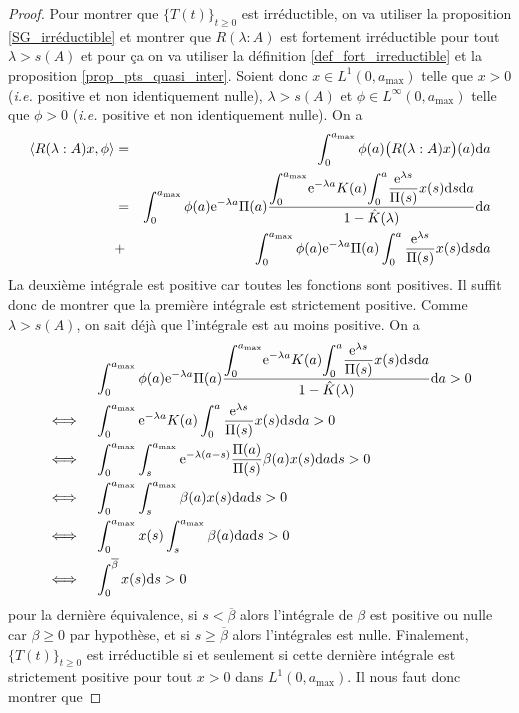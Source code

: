 \begin{proof}
    Pour montrer que $\big\{T(t)\big\}_{t \geq 0}$ est irréductible, on va utiliser la proposition \ref{SG_irréductible} et montrer que $R(\lambda : A)$ est fortement irréductible pour tout $\lambda > s(A)$ et pour ça on va utiliser la définition \ref{def_fort_irreductible} et la proposition \ref{prop_pts_quasi_inter}. Soient donc $x \in L^1(0,a_{\max})$ telle que $x > 0$ (\textit{i.e.} positive et non identiquement nulle), $\lambda > s(A)$ et $\phi \in L^{\infty}(0,a_{\max})$ telle que $\phi > 0$ (\textit{i.e.} positive et non identiquement nulle). On a 
    \begin{eqnarray*}
        \langle R(\lambda : A)x,\phi \rangle &=& \int_0^{a_{\max}} \phi(a)\big(R(\lambda : A)x\big)(a)\mathrm{d} a \\
        &=& \int_0^{a_{\max}} \phi(a)\mathrm{e}^{-\lambda a}\Pi(a)\frac{\displaystyle{\int_0^{a_{\max}}}\mathrm{e}^{-\lambda a}K(a)\displaystyle{\int_0^a} \dfrac{\mathrm{e}^{\lambda s}}{\Pi(s)}x(s)\mathrm{d} s\mathrm{d} a}{1-\hat{K}(\lambda)}\mathrm{d} a \\
        &+& \int_0^{a_{\max}} \phi(a)\mathrm{e}^{-\lambda a}\Pi(a)\int_0^a \frac{\mathrm{e}^{\lambda s}}{\Pi(s)}x(s)\mathrm{d} s\mathrm{d} a
    \end{eqnarray*}
    La deuxième intégrale est positive car toutes les fonctions sont positives. Il suffit donc de montrer que la première intégrale est strictement positive. Comme $\lambda > s(A)$, on sait déjà que l'intégrale est au moins positive. On a 
    \begin{align*}
        &\int_0^{a_{\max}} \phi(a)\mathrm{e}^{-\lambda a}\Pi(a)\frac{\displaystyle{\int_0^{a_{\max}}}\mathrm{e}^{-\lambda a}K(a)\displaystyle{\int_0^a} \dfrac{\mathrm{e}^{\lambda s}}{\Pi(s)}x(s)\mathrm{d} s\mathrm{d} a}{1-\hat{K}(\lambda)}\mathrm{d} a > 0 \\ 
        \iff\quad & \int_0^{a_{\max}} \mathrm{e}^{-\lambda a}K(a) \int_0^a \frac{\mathrm{e}^{\lambda s}}{\Pi(s)} x(s)\mathrm{d} s \mathrm{d} a > 0 \\
        \iff\quad & \int_0^{a_{\max}} \int_s^{a_{\max}} \mathrm{e}^{-\lambda (a-s)}\frac{\Pi(a)}{\Pi(s)} \beta(a)x(s)\mathrm{d} a \mathrm{d} s > 0 \\
        \iff\quad & \int_0^{a_{\max}} \int_s^{a_{\max}} \beta(a)x(s)\mathrm{d} a\mathrm{d} s >0 \\ 
        \iff\quad & \int_0^{a_{\max}}x(s) \int_s^{a_{\max}} \beta(a)\mathrm{d} a\mathrm{d} s >0 \\ 
        \iff\quad & \int_0^{\overline{\beta}}x(s)\mathrm{d} s >0
    \end{align*}
    pour la dernière équivalence, si $s<\overline{\beta}$ alors l'intégrale de $\beta$ est positive ou nulle car $\beta \geq 0$ par hypothèse, et si $s \geq \overline{\beta}$ alors l'intégrales est nulle. Finalement, $\big\{T(t)\big\}_{t \geq 0}$ est irréductible si et seulement si cette dernière intégrale est strictement positive pour tout $x >0$ dans $L^1(0,a_{\max})$. Il nous faut donc montrer que 

\end{proof}
